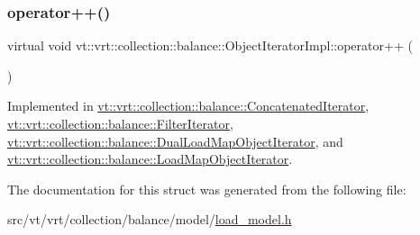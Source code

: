 \mbox{\label{structvt_1_1vrt_1_1collection_1_1balance_1_1_object_iterator_impl_ab59b65c6a22626b6d2d3ab283309ac1f}} 
\subsubsection{\texorpdfstring{operator++()}{operator++()}}
{\footnotesize\ttfamily virtual void vt\+::vrt\+::collection\+::balance\+::\+Object\+Iterator\+Impl\+::operator++ (\begin{DoxyParamCaption}{ }\end{DoxyParamCaption})\hspace{0.3cm}{\ttfamily [pure virtual]}}



Implemented in \hyperlink{structvt_1_1vrt_1_1collection_1_1balance_1_1_concatenated_iterator_aa89d0b18e2595bda59867f3254658125}{vt\+::vrt\+::collection\+::balance\+::\+Concatenated\+Iterator}, \hyperlink{structvt_1_1vrt_1_1collection_1_1balance_1_1_filter_iterator_a354817d66e2736b1de818b4548419476}{vt\+::vrt\+::collection\+::balance\+::\+Filter\+Iterator}, \hyperlink{structvt_1_1vrt_1_1collection_1_1balance_1_1_dual_load_map_object_iterator_a7cb1ececd261483b92541a35df607ca6}{vt\+::vrt\+::collection\+::balance\+::\+Dual\+Load\+Map\+Object\+Iterator}, and \hyperlink{structvt_1_1vrt_1_1collection_1_1balance_1_1_load_map_object_iterator_ad475d61170e3aea498d4d2c403bcc0b1}{vt\+::vrt\+::collection\+::balance\+::\+Load\+Map\+Object\+Iterator}.



The documentation for this struct was generated from the following file\+:\begin{DoxyCompactItemize}
\item 
src/vt/vrt/collection/balance/model/\hyperlink{load__model_8h}{load\+\_\+model.\+h}\end{DoxyCompactItemize}
